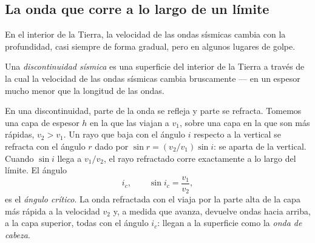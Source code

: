 \subsection{La onda que corre a lo largo de un límite}

En el interior de la Tierra, la velocidad de las ondas sísmicas cambia con la
profundidad, casi siempre de forma gradual, pero en algunos lugares de golpe.

\begin{definition}\label{def:g11:seismic-structure:discontinuity}
Una \emph{discontinuidad sísmica}
es una superficie del interior de la Tierra a través de la cual la velocidad
de las ondas sísmicas cambia bruscamente --- en un espesor mucho menor que la
longitud de las ondas.
\end{definition}

En una discontinuidad, parte de la onda se refleja y parte se refracta. Tomemos
una capa de espesor $h$ en la que las  viajan a $v_1$, sobre una capa
en la que son más rápidas, $v_2 > v_1$. Un rayo que baja con el ángulo $i$
respecto a la vertical se refracta con el ángulo $r$ dado por $\sin r = (v_2/v_1)\sin
i$: se aparta de la vertical. Cuando $\sin i$ llega a $v_1/v_2$, el
rayo refractado corre exactamente a lo largo del límite. El ángulo
\[
  i_c, \qquad \sin i_c = \frac{v_1}{v_2},
\]
es el \emph{ángulo crítico}. La onda
refractada con el  viaja por la parte alta de la capa más
rápida a la velocidad $v_2$ y, a medida que avanza, devuelve ondas hacia
arriba, a la capa superior, todas con el ángulo
$i_c$: llegan a la superficie como la \emph{onda de cabeza}.

